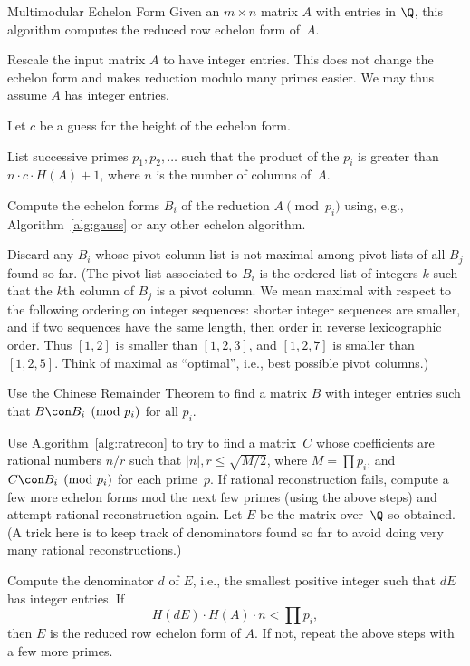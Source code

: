 \begin{algorithm}{Multimodular Echelon Form}\label{alg:modech}%
Given an $m\times n$ matrix $A$ with entries in $\Q$,
this algorithm computes the reduced row echelon form of~$A$.
\begin{steps}
\item Rescale the input matrix $A$ to have integer entries.  This does
  not change the echelon form and makes reduction modulo many primes
  easier.  We may thus assume $A$ has integer entries.

\item Let $c$ be a guess for the height of the echelon form. 

\item List successive primes $p_1, p_2, \ldots$
 such that the product of the $p_i$ is greater than 
$n \cdot c \cdot H(A) + 1$, where $n$ is the number of columns of~$A$.

\item Compute the echelon forms $B_i$ of the reduction $A\pmod{p_i}$
  using, e.g., Algorithm~\ref{alg:gauss} or any other echelon
  algorithm. %

\item\label{step:discard} Discard any $B_i$ whose pivot column list is
  not maximal among pivot lists of all $B_j$ found so far.  (The pivot
  list associated to $B_i$ is the ordered list of integers $k$ such
  that the $k$th column of $B_j$ is a pivot column.  We mean maximal
  with respect to the following ordering on integer sequences: shorter
  integer sequences are smaller, and if two sequences have the same
  length, then order in reverse lexicographic order.  Thus $[1,2]$ is
  smaller than $[1,2,3]$, and $[1,2,7]$ is smaller than $[1,2,5]$.
  Think of maximal as ``optimal'', i.e., best possible pivot columns.)

\item Use the Chinese Remainder Theorem to find a matrix $B$ with
  integer entries such that $B \con B_i \pmod{p_i}$ for all $p_i$.

\item Use Algorithm~\ref{alg:ratrecon}
to try to find a matrix~$C$ whose coefficients are rational 
numbers $n/r$ such that
$|n|, r \leq \sqrt{M/2}$, where $M=\prod p_i$, 
and $C \con B_i \pmod{p_i}$ for each prime~$p$.
If rational reconstruction fails,
compute a few more echelon forms mod the next few primes (using
the above steps)  and attempt rational reconstruction again.
Let $E$ be the matrix over~$\Q$ so obtained.
(A trick here is to keep track of denominators found
so far to avoid doing very many rational reconstructions.)

\item Compute the denominator $d$ of $E$, i.e., the smallest positive
  integer such that $dE$ has integer entries.  If 
\begin{equation}\label{eqn:modalgbound}
  H(dE) \cdot H(A)
  \cdot n < \prod p_i, 
\end{equation}
then $E$ is the reduced row echelon form of $A$.  If not,
repeat the above steps with a few more primes.  
\end{steps}
\end{algorithm}
